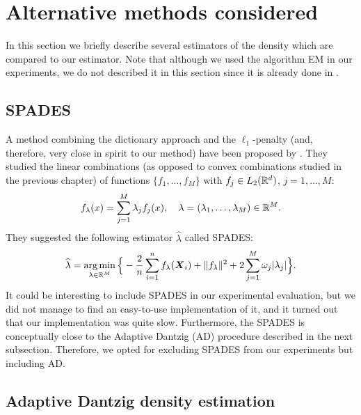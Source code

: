 \section{Alternative methods considered}

In this section we briefly describe several estimators of the density which are compared to our estimator. Note that although we used the algorithm EM in our experiments, we do not described it in this section since it is already done in .
\subsection{SPADES}
A method combining the dictionary approach and the $\ell_1$-penalty (and, therefore, very close in spirit to our method) have been proposed by \citep{SPADES}. They studied the linear combinations (as opposed to convex combinations studied in the previous chapter) of functions $\{f_1,\dots,f_M\}$ with $f_j\in L_2({\mathbb R}^d)$, $j=1,\dots,M$:
\begin{equation}
    f_{\lambda}(x)=\sum_{j=1}^M\lambda_j f_j(x), \quad \lambda = (\lambda_1,\dots,\lambda_M)\in {\mathbb R}^M.
\end{equation}
They suggested the following estimator $\hat \lambda$ called SPADES:
\begin{equation}
    \widehat\lambda = \operatorname*{arg\,min}_{\lambda \in {\mathbb R}^M}\Big\{-\frac{2}{n}\sum_{i=1}^n f_{\lambda}(\boldsymbol X_i) +\|f_{\lambda}\|^2 +2\sum_{j=1}^M\omega_j|\lambda_j|\Big\}.
\end{equation}
It could be interesting to include SPADES in our experimental evaluation, but we did not manage to find an easy-to-use implementation of it, and it turned out that our implementation was quite slow. Furthermore, the SPADES is conceptually close to the Adaptive Dantzig (AD) \citep{Bertin} procedure described in the next subsection. Therefore, we opted for excluding SPADES from our experiments but including AD.

\subsection{Adaptive Dantzig density estimation\label{ad_section}}

